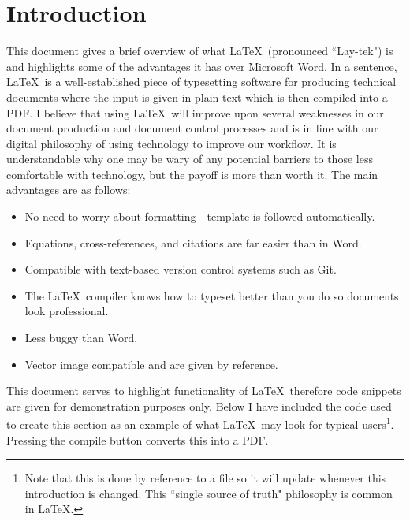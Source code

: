 \section{Introduction}
\label{sec:Introduction}

This document gives a brief overview of what \LaTeX\ (pronounced ``Lay-tek") is and highlights some of the advantages it has over Microsoft Word. In a sentence, \LaTeX\ is a well-established piece of typesetting software for producing technical documents where the input is given in plain text which is then compiled into a PDF. I believe that using \LaTeX\ will improve upon several weaknesses in our document production and document control processes and is in line with our digital philosophy of using technology to improve our workflow. It is understandable why one may be wary of any potential barriers to those less comfortable with technology, but the payoff is more than worth it. The main advantages are as follows:

\begin{itemize}
	\item No need to worry about formatting - template is followed automatically.
	\item Equations, cross-references, and citations are far easier than in Word.
	\item Compatible with text-based version control systems such as Git.
	\item The \LaTeX\ compiler knows how to typeset better than you do so documents look professional.
	\item Less buggy than Word.
	\item Vector image compatible and are given by reference.
\end{itemize}

This document serves to highlight functionality of \LaTeX\, therefore code snippets are given for demonstration purposes only. Below I have included the code used to create this section as an example of what \LaTeX\ may look for typical users\footnote{Note that this is done by reference to a file so it will update whenever this introduction is changed. This ``single source of truth" philosophy is common in \LaTeX.}. Pressing the compile button converts this into a PDF.